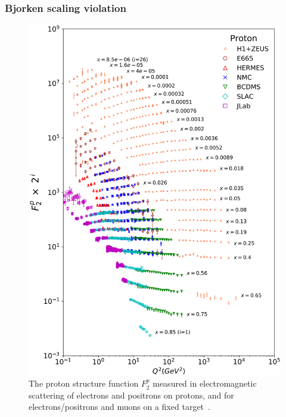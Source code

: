 \subsubsection{Bjorken scaling violation}
\begin{figure}[htb]
    \centering
    \includegraphics[width=0.6\linewidth]{Figures/Chapter 2/F2Results.png}
    \caption{The proton structure function $F^p_2$ measured in electromagnetic scattering of electrons and positrons on protons, and for electrons/positrons and muons on a fixed target~\cite{pdg}.}
    \label{fig:scaling_violation}
\end{figure}

